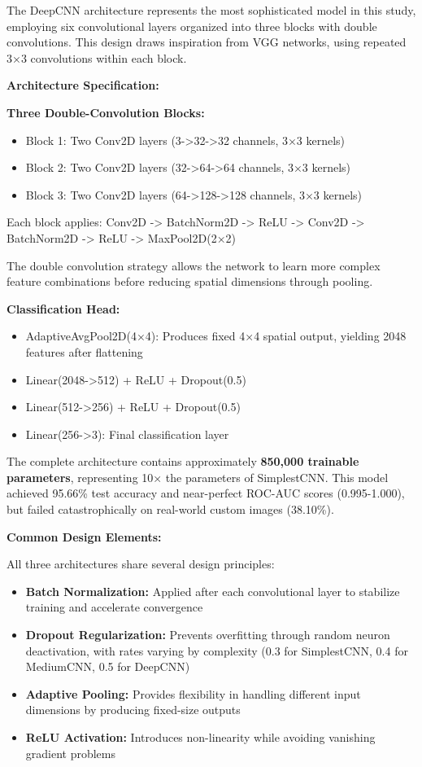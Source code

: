 \documentclass[12pt,a4paper]{article}
\begin{document}
The DeepCNN architecture represents the most sophisticated model in this study, employing six convolutional layers organized into three blocks with double convolutions. This design draws inspiration from VGG networks, using repeated 3×3 convolutions within each block.

\textbf{Architecture Specification:}

\textbf{Three Double-Convolution Blocks:}
\begin{itemize}
    \item Block 1: Two Conv2D layers (3->32->32 channels, 3×3 kernels)
    \item Block 2: Two Conv2D layers (32->64->64 channels, 3×3 kernels)
    \item Block 3: Two Conv2D layers (64->128->128 channels, 3×3 kernels)
\end{itemize}

Each block applies: Conv2D -> BatchNorm2D -> ReLU -> Conv2D -> BatchNorm2D -> ReLU -> MaxPool2D(2×2)

The double convolution strategy allows the network to learn more complex feature combinations before reducing spatial dimensions through pooling.

\textbf{Classification Head:}
\begin{itemize}
    \item AdaptiveAvgPool2D(4×4): Produces fixed 4×4 spatial output, yielding 2048 features after flattening
    \item Linear(2048->512) + ReLU + Dropout(0.5)
    \item Linear(512->256) + ReLU + Dropout(0.5)
    \item Linear(256->3): Final classification layer
\end{itemize}

The complete architecture contains approximately \textbf{850,000 trainable parameters}, representing 10× the parameters of SimplestCNN. This model achieved 95.66\% test accuracy and near-perfect ROC-AUC scores (0.995-1.000), but failed catastrophically on real-world custom images (38.10\%).

\textbf{Common Design Elements:}

All three architectures share several design principles:
\begin{itemize}
    \item \textbf{Batch Normalization:} Applied after each convolutional layer to stabilize training and accelerate convergence
    \item \textbf{Dropout Regularization:} Prevents overfitting through random neuron deactivation, with rates varying by complexity (0.3 for SimplestCNN, 0.4 for MediumCNN, 0.5 for DeepCNN)
    \item \textbf{Adaptive Pooling:} Provides flexibility in handling different input dimensions by producing fixed-size outputs
    \item \textbf{ReLU Activation:} Introduces non-linearity while avoiding vanishing gradient problems
\end{itemize}
\end{document}
